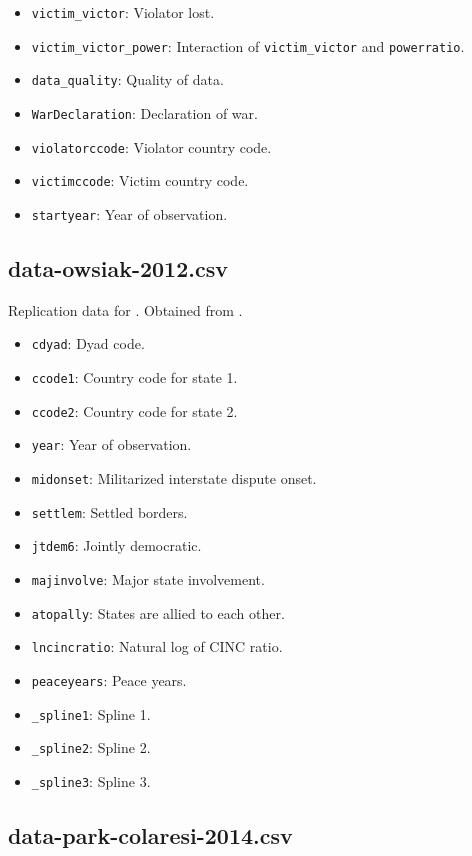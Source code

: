 \documentclass[12pt]{article}
\begin{document}
\begin{itemize}
  \item \texttt{victim\_victor}: Violator lost.
  \item \texttt{victim\_victor\_power}: Interaction of \texttt{victim\_victor} and \texttt{powerratio}.
  \item \texttt{data\_quality}: Quality of data.
  \item \texttt{WarDeclaration}: Declaration of war.
  \item \texttt{violatorccode}: Violator country code.
  \item \texttt{victimccode}: Victim country code.
  \item \texttt{startyear}: Year of observation.
\end{itemize}

\subsection{data-owsiak-2012.csv}

Replication data for \citet{Owsiak:2012dx}.
Obtained from \citet{owsiak2012data}.

\begin{itemize}
  \item \texttt{cdyad}: Dyad code.
  \item \texttt{ccode1}: Country code for state 1.
  \item \texttt{ccode2}: Country code for state 2. 
  \item \texttt{year}: Year of observation.
  \item \texttt{midonset}: Militarized interstate dispute onset.
  \item \texttt{settlem}: Settled borders.
  \item \texttt{jtdem6}: Jointly democratic.
  \item \texttt{majinvolve}: Major state involvement.
  \item \texttt{atopally}: States are allied to each other.
  \item \texttt{lncincratio}: Natural log of CINC ratio.
  \item \texttt{peaceyears}: Peace years.
  \item \texttt{\_spline1}: Spline 1.
  \item \texttt{\_spline2}: Spline 2.
  \item \texttt{\_spline3}: Spline 3.
\end{itemize}


\subsection{data-park-colaresi-2014.csv}
\end{document}
